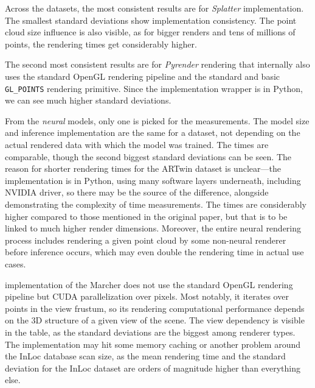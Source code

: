 Across the datasets, the most consistent results are for \CC{} \emph{Splatter}
implementation. The smallest standard deviations show
implementation consistency. The point cloud size influence is also visible,
as for bigger renders and tens of millions of points, the rendering times
get considerably higher.

The second most consistent results are for
\emph{Pyrender} rendering that internally also uses the standard OpenGL
rendering pipeline and the standard and basic \verb|GL_POINTS| rendering
primitive. Since the implementation wrapper is in Python, we can see much
higher standard deviations.

From the \emph{neural} models, only one is picked for the measurements.
The model size and inference implementation are the same for a dataset, not
depending on the actual rendered data with which the model was trained. The times
are comparable, though the second biggest standard deviations can be seen.
The reason for shorter rendering times for the ARTwin dataset is unclear---the
implementation is in Python, using many software layers underneath, including
NVIDIA driver, so there may be the source of the difference,
alongside demonstrating the complexity of time measurements. The times
are considerably higher compared to those mentioned in the original paper,
but that is to be linked to much higher render dimensions. Moreover, the entire
neural rendering process includes rendering a given point cloud by some
non-neural renderer before inference occurs, which may even double the
rendering time in actual use cases.

\CC{} implementation of the Marcher does not use the standard OpenGL rendering
pipeline but CUDA parallelization over pixels. Most notably, it
iterates over points in the view frustum, so its rendering computational
performance depends on the 3D structure of a given view of the scene. The
view dependency is  visible in the table, as the standard deviations are
the biggest among renderer types. The implementation may hit some memory
caching or another problem around the InLoc database scan size, as the mean
rendering time and the standard deviation for the InLoc dataset are orders
of magnitude higher than everything else.



